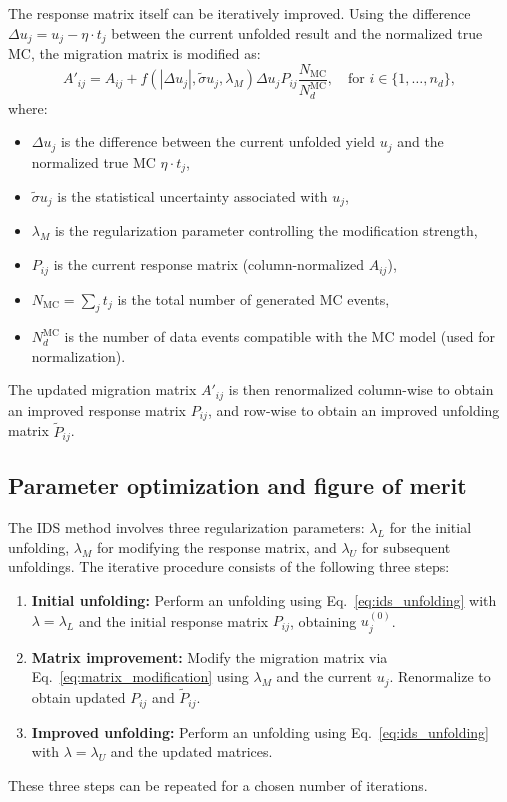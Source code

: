 The response matrix itself can be iteratively improved. Using the difference
$\Delta u_j = u_j - \eta \cdot t_j$ between the current unfolded result and the
normalized true MC, the migration matrix is modified as:
\begin{equation}
    A'_{ij} = A_{ij} + f\left(|\Delta u_j|, \tilde{\sigma} u_j, \lambda_M\right) \Delta u_j P_{ij} \frac{N_{\text{MC}}}{N_d^{\text{MC}}}, \quad \text{for } i \in \{1,\dots,n_d\},
    \label{eq:matrix_modification}
\end{equation}
where:
\begin{itemize}
    \item $\Delta u_j$ is the difference between the current unfolded yield $u_j$ and the normalized true MC $\eta \cdot t_j$,
    \item $\tilde{\sigma} u_j$ is the statistical uncertainty associated with $u_j$,
    \item $\lambda_M$ is the regularization parameter controlling the modification strength,
    \item $P_{ij}$ is the current response matrix (column-normalized $A_{ij}$),
    \item $N_{\text{MC}} = \sum_j t_j$ is the total number of generated MC events,
    \item $N_d^{\text{MC}}$ is the number of data events compatible with the MC model (used for normalization).
\end{itemize}
The updated migration matrix $A'_{ij}$ is then renormalized column-wise to obtain an improved response matrix $P_{ij}$, and row-wise to obtain an improved unfolding matrix $\tilde{P}_{ij}$.

\subsection{Parameter optimization and figure of merit}

The IDS method involves three regularization parameters: $\lambda_L$ for the
initial unfolding, $\lambda_M$ for modifying the response matrix, and
$\lambda_U$ for subsequent unfoldings. The iterative procedure consists of the
following three steps:
\begin{enumerate}
    \item \textbf{Initial unfolding:} Perform an unfolding using Eq.~\eqref{eq:ids_unfolding} with $\lambda = \lambda_L$ and the initial response matrix $P_{ij}$, obtaining $u_j^{(0)}$.
    \item \textbf{Matrix improvement:} Modify the migration matrix via Eq.~\eqref{eq:matrix_modification} using $\lambda_M$ and the current $u_j$. Renormalize to obtain updated $P_{ij}$ and $\tilde{P}_{ij}$.
    \item \textbf{Improved unfolding:} Perform an unfolding using Eq.~\eqref{eq:ids_unfolding} with $\lambda = \lambda_U$ and the updated matrices.
\end{enumerate}
These three steps can be repeated for a chosen number of iterations.


